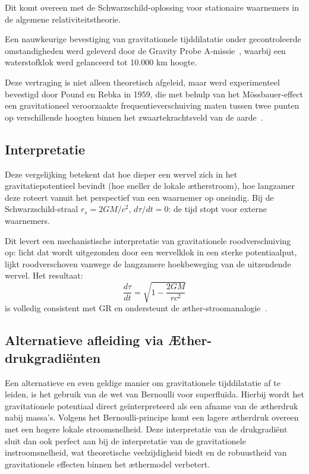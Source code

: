 Dit komt overeen met de Schwarzschild-oplossing voor stationaire waarnemers in de algemene relativiteitstheorie.

Een nauwkeurige bevestiging van gravitationele tijddilatatie onder gecontroleerde omstandigheden werd geleverd door de Gravity Probe A-missie~\cite{vessot_levine_1980}, waarbij een waterstofklok werd gelanceerd tot 10.000 km hoogte.

Deze vertraging is niet alleen theoretisch afgeleid, maar werd experimenteel bevestigd door Pound en Rebka in 1959, die met behulp van het M\"ossbauer-effect een gravitationeel veroorzaakte frequentieverschuiving maten tussen twee punten op verschillende hoogten binnen het zwaartekrachtsveld van de aarde~\cite{pound_rebka_1959}.


\subsection*{Interpretatie}

Deze vergelijking betekent dat hoe dieper een wervel zich in het gravitatiepotentieel bevindt (hoe sneller de lokale ætherstroom), hoe langzamer deze roteert vanuit het perspectief van een waarnemer op oneindig. Bij de Schwarzschild-straal $r_s = 2GM/c^2$, $d\tau/dt = 0$: de tijd stopt voor externe waarnemers.

Dit levert een mechanistische interpretatie van gravitationele roodverschuiving op: licht dat wordt uitgezonden door een wervelklok in een sterke potentiaalput, lijkt roodverschoven vanwege de langzamere hoekbeweging van de uitzendende wervel. Het resultaat:
\[
    \boxed{\frac{d\tau}{dt} = \sqrt{1 - \frac{2GM}{rc^2}}}
\]
is volledig consistent met GR en ondersteunt de æther-stroomanalogie~\cite{Schiller2022-maxforce}.

\subsection*{Alternatieve afleiding via Æther-drukgradiënten}

Een alternatieve en even geldige manier om gravitationele tijddilatatie af te leiden, is het gebruik van de wet van Bernoulli voor superfluïda. Hierbij wordt het gravitationele potentiaal direct geïnterpreteerd als een afname van de ætherdruk nabij massa's. Volgens het Bernoulli-principe komt een lagere ætherdruk overeen met een hogere lokale stroomsnelheid. Deze interpretatie van de drukgradiënt sluit dan ook perfect aan bij de interpretatie van de gravitationele instroomsnelheid, wat theoretische veelzijdigheid biedt en de robuustheid van gravitationele effecten binnen het æthermodel verbetert.